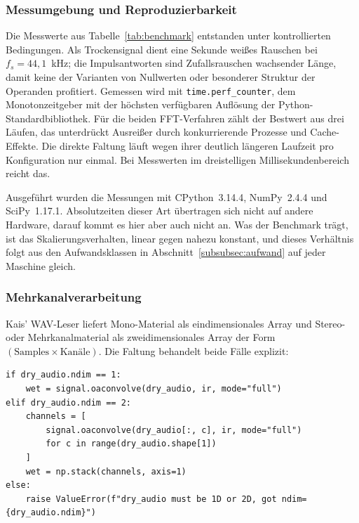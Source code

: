 \subsubsection{Messumgebung und Reproduzierbarkeit}
\label{subsubsec:messumgebung}

Die Messwerte aus Tabelle~\ref{tab:benchmark} entstanden unter kontrollierten
Bedingungen. Als Trockensignal dient eine Sekunde weißes Rauschen bei
$f_s = 44{,}1$~kHz; die Impulsantworten sind Zufallsrauschen wachsender Länge,
damit keine der Varianten von Nullwerten oder besonderer Struktur der
Operanden profitiert. Gemessen wird mit \texttt{time.perf\_counter}, dem
Monotonzeitgeber mit der höchsten verfügbaren Auflösung der
Python-Standardbibliothek. Für die beiden FFT-Verfahren zählt der Bestwert aus
drei Läufen, das unterdrückt Ausreißer durch konkurrierende Prozesse und
Cache-Effekte. Die direkte Faltung läuft wegen ihrer deutlich längeren
Laufzeit pro Konfiguration nur einmal. Bei Messwerten im dreistelligen
Millisekundenbereich reicht das.

Ausgeführt wurden die Messungen mit CPython~3.14.4, NumPy~2.4.4 und
SciPy~1.17.1. Absolutzeiten dieser Art übertragen sich nicht auf andere
Hardware, darauf kommt es hier aber auch nicht an. Was der Benchmark trägt,
ist das Skalierungsverhalten, linear gegen nahezu konstant, und dieses
Verhältnis folgt aus den Aufwandsklassen in
Abschnitt~\ref{subsubsec:aufwand} auf jeder Maschine gleich.

\subsubsection{Mehrkanalverarbeitung}
\label{subsubsec:mehrkanal}

Kais' WAV-Leser liefert Mono-Material als eindimensionales Array und
Stereo- oder Mehrkanalmaterial als zweidimensionales Array der Form
$(\text{Samples} \times \text{Kanäle})$. Die Faltung behandelt beide Fälle
explizit:

\begin{lstlisting}[style=cemdsp, caption={Mono- und Mehrkanal-Faltung in \texttt{convolve}.}, label={lst:mehrkanal}]
if dry_audio.ndim == 1:
    wet = signal.oaconvolve(dry_audio, ir, mode="full")
elif dry_audio.ndim == 2:
    channels = [
        signal.oaconvolve(dry_audio[:, c], ir, mode="full")
        for c in range(dry_audio.shape[1])
    ]
    wet = np.stack(channels, axis=1)
else:
    raise ValueError(f"dry_audio must be 1D or 2D, got ndim={dry_audio.ndim}")
\end{lstlisting}

